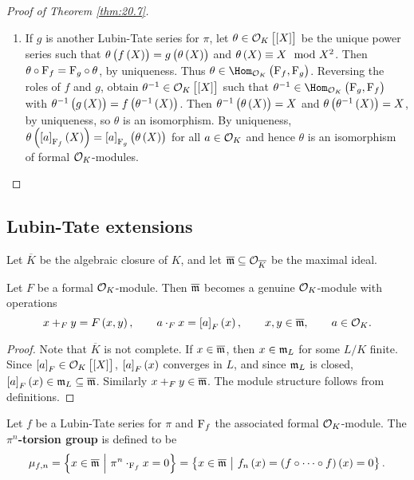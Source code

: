 \begin{proof}[Proof of Theorem \ref{thm:20.7}]
\begin{enumerate}
\item If $ g $ is another Lubin-Tate series for $ \pi $, let $ \theta \in \OOO_K\sbr{\sbr{X}} $ be the unique power series such that $ \theta\br{f\br{X}} = g\br{\theta\br{X}} $ and $ \theta\br{X} \equiv X \mod X^2 $. Then $ \theta \circ \mathrm{F}_f = \mathrm{F}_g \circ \theta $, by uniqueness. Thus $ \theta \in \Hom_{\OOO_K}\br{\F_f, \F_g} $. Reversing the roles of $ f $ and $ g $, obtain $ \theta^{-1} \in \OOO_K\sbr{\sbr{X}} $ such that $ \theta^{-1} \in \Hom_{\OOO_K}\br{\F_g, \F_f} $ with $ \theta^{-1}\br{g\br{X}} = f\br{\theta^{-1}\br{X}} $. Then $ \theta^{-1}\br{\theta\br{X}} = X $ and $ \theta\br{\theta^{-1}\br{X}} = X $, by uniqueness, so $ \theta $ is an isomorphism. By uniqueness, $ \theta\br{\sbr{a}_{\F_f}\br{X}} = \sbr{a}_{\F_g}\br{\theta\br{X}} $ for all $ a \in \mathcal{O}_K $ and hence $ \theta $ is an isomorphism of formal $ \mathcal{O}_K $-modules.
\end{enumerate}
\end{proof}

\pagebreak

\subsection{Lubin-Tate extensions}

Let $ \overline{K} $ be the algebraic closure of $ K $, and let $ \overline{\mathfrak{m}} \subseteq \mathcal{O}_{\overline{K}} $ be the maximal ideal.

\begin{lemma}
Let $ F $ be a formal $ \mathcal{O}_K $-module. Then $ \overline{\mathfrak{m}} $ becomes a genuine $ \mathcal{O}_K $-module with operations
$$ x +_F y = F\br{x, y}, \qquad a \cdot_F x = \sbr{a}_F\br{x}, \qquad x, y \in \overline{\mmm}, \qquad a \in \OOO_K. $$
\end{lemma}

\begin{proof}
Note that $ \overline{K} $ is not complete. If $ x \in \overline{\mathfrak{m}} $, then $ x \in \mathfrak{m}_L $ for some $ L / K $ finite. Since $ \sbr{a}_F \in \OOO_K\sbr{\sbr{X}} $, $ \sbr{a}_F\br{x} $ converges in $ L $, and since $ \mathfrak{m}_L $ is closed, $ \sbr{a}_F\br{x} \in \mmm_L \subseteq \overline{\mmm} $. Similarly $ x +_F y \in \overline{\mathfrak{m}} $. The module structure follows from definitions.
\end{proof}

\begin{definition}
Let $ f $ be a Lubin-Tate series for $ \pi $ and $ \mathrm{F}_f $ the associated formal $ \mathcal{O}_K $-module. The \textbf{$ \pi^n $-torsion group} is defined to be
$$ \mu_{f, n} = \cbr{x \in \overline{\mmm} \st \pi^n \cdot_{\F_f} x = 0} = \cbr{x \in \overline{\mmm} \st f_n\br{x} = \br{f \circ \dots \circ f}\br{x} = 0}. $$
\end{definition}

